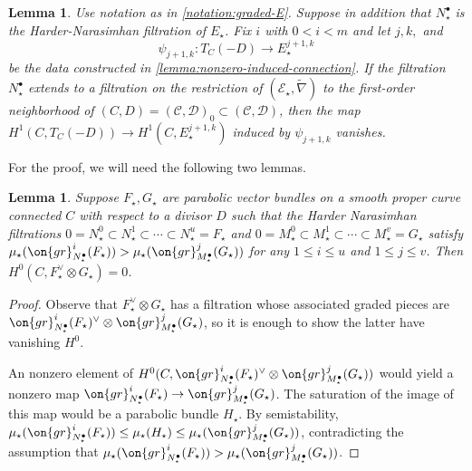 \documentclass[12 pt]{amsart}
\theoremstyle{plain}
\newtheorem{lemma}[subsubsection]{Lemma}
\theoremstyle{definition}
\newtheorem{remark}[subsubsection]{Remark}
\theoremstyle{remark}
\numberwithin{equation}{section}
\begin{document}
%	
%
\begin{lemma}
	\label{proposition:filtered-h1-map}
	Use notation as in \autoref{notation:graded-E}. Suppose in addition that $N_\star^\bullet$ is the Harder-Narasimhan filtration of $E_\star$. Fix $i$ with $0<i<m$ and let $j,k,$ and $$\psi_{j+1, k}: T_C(-D)\to E_\star^{j+1,k}$$ be the data constructed in \autoref{lemma:nonzero-induced-connection}. If the filtration $N_\star^\bullet$ extends to a filtration on the restriction of
$(\mathscr E_\star,\widetilde{\nabla} )$ to the first-order neighborhood of $(C,D)=(\mathscr{C}, \mathscr{D})_0\subset (\mathscr{C}, \mathscr{D})$, 
then the map
$H^1(C, T_C(-D))\to H^1(C, E_\star^{j+1,k})$
	induced by $\psi_{j+1, k}$
vanishes.
\end{lemma}
For the proof, we will need the following two  lemmas.
\begin{lemma}
	\label{lemma:hn-sections-vanishing}
	Suppose $F_\star, G_\star$ are parabolic vector bundles on a smooth
	proper curve connected $C$ with respect to a divisor $D$
	such that the Harder Narasimhan filtrations $0 = N^0_\star \subset N^1_\star
	\subset \cdots \subset N^u_\star= F_\star$ and 
	$0 = M^0_\star \subset M^1_\star
	\subset \cdots \subset M^v_\star= G_\star$
	satisfy
 $\mu_\star(\on{gr}_{N_\star^\bullet}^i(F_\star)) >
\mu_\star(\on{gr}_{M_\star^\bullet}^j(G_\star))$
for any $1 \leq i \leq u$ and $1 \leq j \leq v$.
Then $H^0(C, F_\star^\vee \otimes G_\star) = 0$.
\end{lemma}
\begin{proof}
Observe that $F_\star^\vee \otimes G_\star$ has a filtration whose associated graded pieces are
	$\on{gr}_{N_\star^\bullet}^i(F_\star)^\vee \otimes
	\on{gr}_{M_\star^\bullet}^j(G_\star)$,
	so it is enough to show the latter have vanishing $H^0$.

	An nonzero element of $H^0(C, \on{gr}_{N_\star^\bullet}^i(F_\star)^\vee \otimes
\on{gr}_{M_\star^\bullet}^j(G_\star))$ would yield a nonzero map
	$\on{gr}_{N_\star^\bullet}^i(F_\star) \to
	\on{gr}_{M_\star^\bullet}^j(G_\star)$.
	The saturation of the image of this map would be a parabolic bundle
$H_\star$. By semistability, $\mu_\star(\on{gr}_{N_\star^\bullet}^i(F_\star)) \leq
\mu_\star(H_\star) \leq \mu_\star(\on{gr}_{M_\star^\bullet}^j(G_\star))$,
	contradicting the assumption that 
	$\mu_\star(\on{gr}_{N_\star^\bullet}^i(F_\star)) >
	\mu_\star(\on{gr}_{M_\star^\bullet}^j(G_\star))$.
\end{proof}
\end{document}
